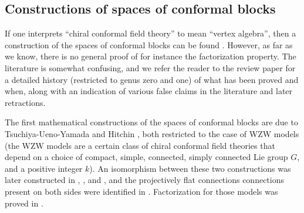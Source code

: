 \documentclass[a4paper,10pt,leqno]{amsart}
\theoremstyle{plain}
\theoremstyle{definition}
\theoremstyle{remark}
\DeclareRobustCommand{\SkipTocEntry}[5]{}
\begin{document}
\subsection*{Constructions of spaces of conformal blocks}
If one interprets ``chiral conformal field theory'' to mean ``vertex algebra'', then a construction of the spaces of conformal blocks can be found \cite[Chapter 10]{Frenkel--Ben-Zvi}.
However, as far as we know, there is no general proof of for instance the factorization property. 
The literature is somewhat confusing, and we refer the reader to the review paper \cite{Huang-Lepowsky(Tensor-categories-and-the-mathematics-of-rational-and-logarithmic-conformal-field-theory)} for a detailed history (restricted to genus zero and one) of what has been proved and when, along with an indication of various false claims in the literature and later retractions.

The first mathematical constructions of the spaces of conformal blocks are due to Tsuchiya-Ueno-Yamada \cite{Tsuchiya-Ueno-Yamada(CFT-universal-family)} and Hitchin \cite{Hitchin(Flat-connections-and-geometric-quantization)}, both restricted to the case of WZW models (the WZW models are a certain class of chiral conformal field theories that depend on a choice of compact, simple, connected, simply connected Lie group $G$, and a positive integer $k$).
An isomorphism between these two constructions was later constructed in \cite{Beauville-Laszlo(Conformal-blocks-and-generalized-theta-functions)},
\cite{Faltings(A-proof-for-the-Verlinde-formula)}, and \cite{Kumar-Narasimhan-Ramanathan(Infinite-Grassmannians-and-moduli-spaces-of-G-bundles)},
and the projectively flat connections connections present on both sides were identified in \cite{Laszlo(Hitchin's-and-WZW-connections-are-the-same)}.
Factorization for those models was proved in \cite{Tsuchiya-Ueno-Yamada(CFT-universal-family)}.
\end{document}

